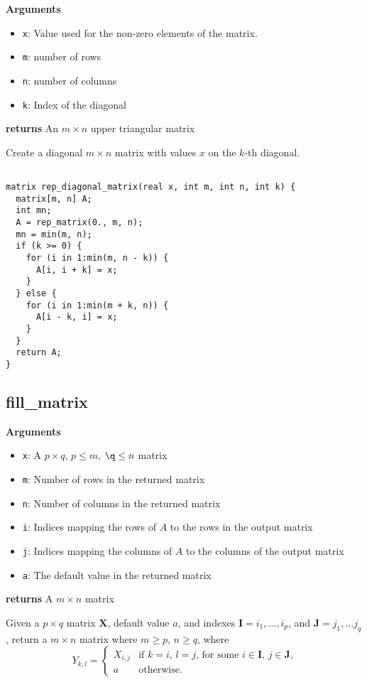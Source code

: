\documentclass[]{book}
\providecommand{\tightlist}{%
  \setlength{\itemsep}{0pt}\setlength{\parskip}{0pt}}
\newcommand{\mat}[1]{\boldsymbol{#1}}
\renewcommand{\vec}[1]{\boldsymbol{#1}}
\begin{document}
\textbf{Arguments}

\begin{itemize}
\tightlist
\item
  \texttt{x}: Value used for the non-zero elements of the matrix.
\item
  \texttt{m}: number of rows
\item
  \texttt{n}: number of columns
\item
  \texttt{k}: Index of the diagonal
\end{itemize}

\textbf{returns} An \(m \times n\) upper triangular matrix

Create a diagonal \(m \times n\) matrix with values \(x\) on the
\(k\)-th diagonal.

\begin{verbatim}

matrix rep_diagonal_matrix(real x, int m, int n, int k) {
  matrix[m, n] A;
  int mn;
  A = rep_matrix(0., m, n);
  mn = min(m, n);
  if (k >= 0) {
    for (i in 1:min(m, n - k)) {
      A[i, i + k] = x;
    }
  } else {
    for (i in 1:min(m + k, n)) {
      A[i - k, i] = x;
    }
  }
  return A;
}

\end{verbatim}

\subsection{fill\_matrix}\label{fill_matrix}

\textbf{Arguments}

\begin{itemize}
\tightlist
\item
  \texttt{x}: A \(p \times q\), \(p \leq m\), \(\q \leq n\) matrix
\item
  \texttt{m}: Number of rows in the returned matrix
\item
  \texttt{n}: Number of columns in the returned matrix
\item
  \texttt{i}: Indices mapping the rows of \(A\) to the rows in the
  output matrix
\item
  \texttt{j}: Indices mapping the columns of \(A\) to the columns of the
  output matrix
\item
  \texttt{a}: The default value in the returned matrix
\end{itemize}

\textbf{returns} A \(m \times n\) matrix

Given a \(p \times q\) matrix \(\mat{X}\), default value \(a\), and
indexes \(\vec{I} = i_1, ..., i_p\), and \(\vec{J} = j_1, ...j_q\),
return a \(m \times n\) matrix where \(m \geq p\), \(n \geq q\), where
\[
Y_{k, l} =
\begin{cases}
X_{i, j} & \text{if $k = i$, $l = j$, for some $i \in \vec{I}$, $j \in \vec{J}$,} \\
a & \text{otherwise} .
\end{cases}
\]
\end{document}
